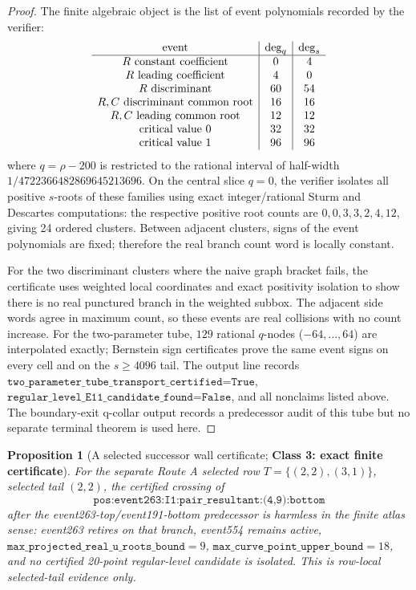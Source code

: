 \documentclass[11pt]{article}
\newtheorem{proposition}{Proposition}
\newcommand{\classthree}{\textbf{Class 3: exact finite certificate}}
\begin{document}
\begin{proof}
The finite algebraic object is the list of event polynomials recorded by the verifier:
\[
\begin{array}{c|c|c}
\hbox{event} & \deg_q & \deg_s\\
\hline
R\hbox{ constant coefficient} & 0 & 4\\
R\hbox{ leading coefficient} & 4 & 0\\
R\hbox{ discriminant} & 60 & 54\\
R,C\hbox{ discriminant common root} & 16 & 16\\
R,C\hbox{ leading common root} & 12 & 12\\
\hbox{critical value }0 & 32 & 32\\
\hbox{critical value }1 & 96 & 96
\end{array}
\]
where \(q=\rho-200\) is restricted to the rational interval of half-width \(1/4722366482869645213696\).  On the central slice \(q=0\), the verifier isolates all positive \(s\)-roots of these families using exact integer/rational Sturm and Descartes computations: the respective positive root counts are \(0,0,3,3,2,4,12\), giving 24 ordered clusters.  Between adjacent clusters, signs of the event polynomials are fixed; therefore the real branch count word is locally constant.

For the two discriminant clusters where the naive graph bracket fails, the certificate uses weighted local coordinates and exact positivity isolation to show there is no real punctured branch in the weighted subbox.  The adjacent side words agree in maximum count, so these events are real collisions with no count increase.  For the two-parameter tube, \(129\) rational \(q\)-nodes (\(-64,\ldots,64\)) are interpolated exactly; Bernstein sign certificates prove the same event signs on every cell and on the \(s\ge4096\) tail.  The output line records \(\texttt{two\_parameter\_tube\_transport\_certified=True}\), \(\texttt{regular\_level\_E11\_candidate\_found=False}\), and all nonclaims listed above.  The boundary-exit q-collar output records a predecessor audit of this tube but no separate terminal theorem is used here.
\end{proof}

\begin{proposition}[A selected successor wall certificate; \classthree]\label{prop:event263}
For the separate Route A selected row \(T=\{(2,2),(3,1)\}\), selected tail \((2,2)\), the certified crossing of
\[
\texttt{pos:event263:I1:pair\_resultant:(4,9):bottom}
\]
after the event263-top/event191-bottom predecessor is harmless in the finite atlas sense: event263 retires on that branch, event554 remains active, \(\texttt{max\_projected\_real\_u\_roots\_bound}=9\), \(\texttt{max\_curve\_point\_upper\_bound}=18\), and no certified 20-point regular-level candidate is isolated.  This is row-local selected-tail evidence only.
\end{proposition}
\end{document}
